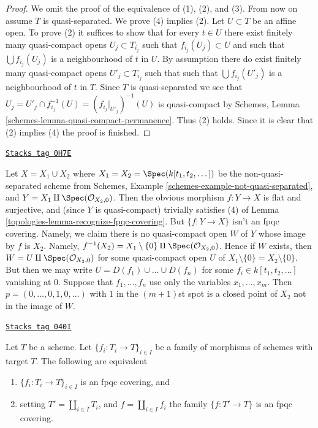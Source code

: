 \begin{proof}
We omit the proof of the equivalence of (1), (2), and (3).
From now on assume $T$ is quasi-separated.
We prove (4) implies (2). Let $U \subset T$ be an affine open.
To prove (2) it suffices to show that for every $t \in U$ there exist
finitely many quasi-compact opens $U_j \subset T_{i_j}$ such that
$f_{i_j}(U_j) \subset U$ and such that $\bigcup f_{i_j}(U_j)$
is a neighbourhood of $t$ in $U$. By assumption there do exist
finitely many quasi-compact opens $U'_j \subset T_{i_j}$ such that
such that $\bigcup f_{i_j}(U'_j)$ is a neighbourhood of $t$ in $T$.
Since $T$ is quasi-separated we see that
$U_j = U'_j \cap f_{i_j}^{-1}(U) = (f_{i_j}|_{U'_j})^{-1}(U)$
is quasi-compact by
Schemes, Lemma \ref{schemes-lemma-quasi-compact-permanence}.
Thus (2) holds. Since it is clear that (2) implies
(4) the proof is finished.
\end{proof}

\begin{example}
\label{topologies-example-not-fpqc}
\href{https://stacks.math.columbia.edu/tag/0H7E}{\texttt{Stacks tag 0H7E}}

Let $X = X_1 \cup X_2$ where $X_1 = X_2 = \Spec(k[t_1,t_2,\dots])$
be the non-quasi-separated scheme from
Schemes, Example \ref{schemes-example-not-quasi-separated}, and
$Y = X_1 \amalg \Spec(\mathcal{O}_{X_2, 0})$.
Then the obvious morphism $f : Y \to X$
is flat and surjective, and (since $Y$ is quasi-compact)
trivially satisfies (4) of Lemma \ref{topologies-lemma-recognize-fpqc-covering}.
But $\{f : Y \to X\}$ isn't an fpqc covering. Namely, we claim there
is no quasi-compact open $W$ of $Y$ whose image by $f$ is $X_2$.
Namely, $f^{-1}(X_2) = X_1 \setminus \{0\} \amalg \Spec(\mathcal{O}_{X_2, 0})$.
Hence if $W$ exists, then $W = U \amalg \Spec(\mathcal{O}_{X_2, 0})$
for some quasi-compact open $U$ of $X_1 \setminus \{0\} = X_2 \setminus \{0\}$.
But then we may write $U = D(f_1) \cup \ldots \cup D(f_n)$ for
some $f_i \in k[t_1, t_2, \ldots]$ vanishing at $0$.
Suppose that $f_1, \ldots, f_n$ use only the variables
$x_1, \ldots, x_m$. Then $p = (0, \ldots, 0, 1, 0, \ldots)$ with $1$
in the $(m + 1)$st spot is a closed point of $X_2$ not in the image
of $W$.
\end{example}

\begin{lemma}
\label{topologies-lemma-disjoint-union-is-fpqc-covering}
\href{https://stacks.math.columbia.edu/tag/040I}{\texttt{Stacks tag 040I}}

Let $T$ be a scheme. Let $\{f_i : T_i \to T\}_{i \in I}$ be a family of
morphisms of schemes with target $T$. The following are equivalent
\begin{enumerate}
\item $\{f_i : T_i \to T\}_{i \in I}$ is an fpqc covering, and
\item setting $T' = \coprod_{i \in I} T_i$, and $f = \coprod_{i \in I} f_i$
the family $\{f : T' \to T\}$ is an fpqc covering.
\end{enumerate}
\end{lemma}

